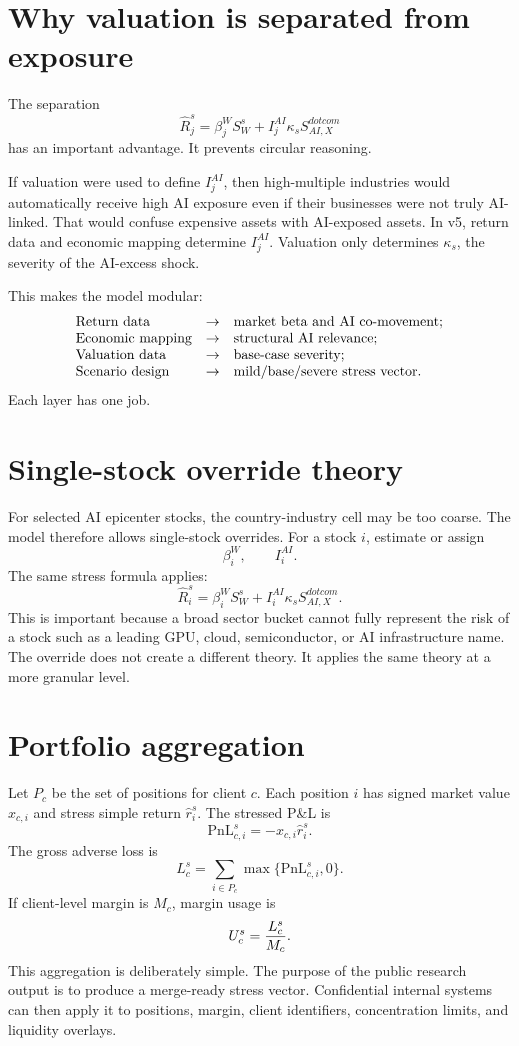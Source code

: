 \documentclass[11pt]{article}
\begin{document}
\section{Why valuation is separated from exposure}

The separation
\[
\widehat R_j^s=\beta_j^W S_W^s+I_j^{AI}\kappa_s S_{AI,X}^{dotcom}
\]
has an important advantage. It prevents circular reasoning.

If valuation were used to define $I_j^{AI}$, then high-multiple industries would automatically receive high AI exposure even if their businesses were not truly AI-linked. That would confuse expensive assets with AI-exposed assets. In v5, return data and economic mapping determine $I_j^{AI}$. Valuation only determines $\kappa_s$, the severity of the AI-excess shock.

This makes the model modular:
\[
\begin{array}{lll}
\hbox{Return data} &\rightarrow& \hbox{market beta and AI co-movement;}\\
\hbox{Economic mapping} &\rightarrow& \hbox{structural AI relevance;}\\
\hbox{Valuation data} &\rightarrow& \hbox{base-case severity;}\\
\hbox{Scenario design} &\rightarrow& \hbox{mild/base/severe stress vector.}
\end{array}
\]
Each layer has one job.

\section{Single-stock override theory}

For selected AI epicenter stocks, the country-industry cell may be too coarse. The model therefore allows single-stock overrides. For a stock $i$, estimate or assign
\[
\beta_i^W,
\qquad I_i^{AI}.
\]
The same stress formula applies:
\[
\widehat R_i^s
=
\beta_i^W S_W^s+I_i^{AI}\kappa_s S_{AI,X}^{dotcom}.
\]
This is important because a broad sector bucket cannot fully represent the risk of a stock such as a leading GPU, cloud, semiconductor, or AI infrastructure name. The override does not create a different theory. It applies the same theory at a more granular level.

\section{Portfolio aggregation}

Let $P_c$ be the set of positions for client $c$. Each position $i$ has signed market value $x_{c,i}$ and stress simple return $\widehat r_i^s$. The stressed P\&L is
\[
\mathrm{PnL}_{c,i}^s=-x_{c,i}\widehat r_i^s.
\]
The gross adverse loss is
\[
L_c^s=\sum_{i\in P_c}\max\{\mathrm{PnL}_{c,i}^s,0\}.
\]
If client-level margin is $M_c$, margin usage is
\[
U_c^s={L_c^s\over M_c}.
\]
This aggregation is deliberately simple. The purpose of the public research output is to produce a merge-ready stress vector. Confidential internal systems can then apply it to positions, margin, client identifiers, concentration limits, and liquidity overlays.
\end{document}
